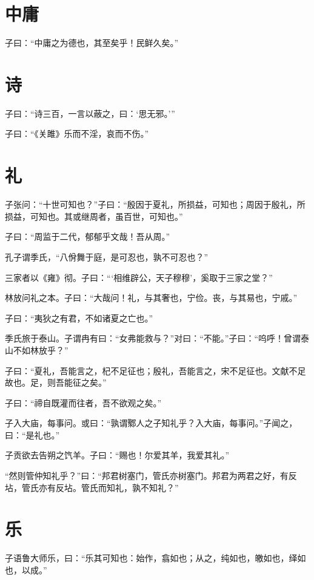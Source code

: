 \documentclass[a5paper]{ctexbook}
\begin{document}
    

    \chapter{中庸}

    子曰：“中庸之为德也，其至矣乎！民鲜久矣。”

    \chapter{诗}

    子曰：“诗三百，一言以蔽之，曰：‘思无邪。’”

    子曰：“《关雎》乐而不淫，哀而不伤。”

    \chapter{礼}

    子张问：“十世可知也？”子曰：“殷因于夏礼，所损益，可知也；周因于殷礼，所损益，可知也。其或继周者，虽百世，可知也。”

    子曰：“周监于二代，郁郁乎文哉！吾从周。”

    孔子谓季氏，“八佾舞于庭，是可忍也，孰不可忍也？”

    三家者以《雍》彻。子曰：“‘相维辟公，天子穆穆’，奚取于三家之堂？”

    林放问礼之本。子曰：“大哉问！礼，与其奢也，宁俭。丧，与其易也，宁戚。”

    子曰：“夷狄之有君，不如诸夏之亡也。”

    季氏旅于泰山。子谓冉有曰：“女弗能救与？”对曰：“不能。”子曰：“呜呼！曾谓泰山不如林放乎？”

    子曰：“夏礼，吾能言之，杞不足征也；殷礼，吾能言之，宋不足征也。文献不足故也。足，则吾能征之矣。”

    子曰：“禘自既灌而往者，吾不欲观之矣。”

    子入大庙，每事问。或曰：“孰谓鄹人之子知礼乎？入大庙，每事问。”子闻之，曰：“是礼也。”

    子贡欲去告朔之饩羊。子曰：“赐也！尔爱其羊，我爱其礼。”

    “然则管仲知礼乎？”曰：“邦君树塞门，管氏亦树塞门。邦君为两君之好，有反坫，管氏亦有反坫。管氏而知礼，孰不知礼？”

    \chapter{乐}

    子语鲁大师乐，曰：“乐其可知也：始作，翕如也；从之，纯如也，皦如也，绎如也，以成。”
\end{document}
